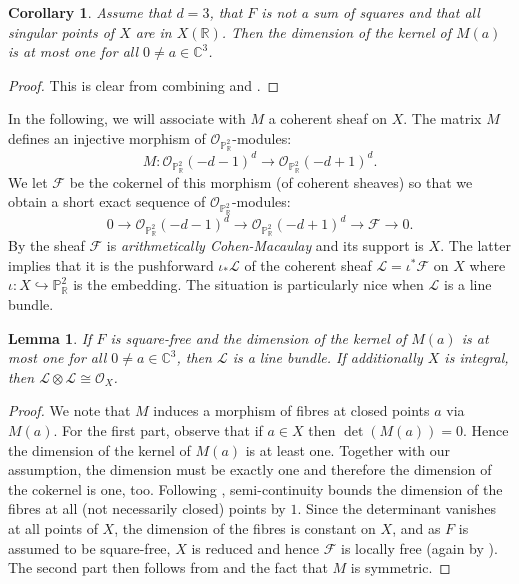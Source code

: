 \documentclass[a4paper,10pt]{amsart}
\theoremstyle{definition}
\theoremstyle{plain}
\newtheorem{lem}[Def]{Lemma}
\newtheorem{cor}[Def]{Corollary}
\newcommand{\cF}{{\mathcal F}}
\newcommand{\cL}{{\mathcal L}}
\newcommand{\cO}{{\mathcal O}}
\newcommand{\C}{{\mathbb C}}
\newcommand{\R}{{\mathbb R}}
\newcommand{\pp}{\mathbb{P}}
\begin{document}
\begin{cor}\label{cor:lb3}
 Assume that $d=3$, that $F$ is not a sum of squares and that all singular points of $X$ are in $X(\R)$. Then the dimension of the kernel of $M(a)$ is at most one for all $0\neq a\in\C^3$.
\end{cor}

\begin{proof}
 This is clear from combining  and . 
\end{proof}

In the following, we will associate with $M$ a coherent sheaf on $X$.
The matrix $M$ defines an injective morphism of $\cO_{\pp^2_\R}$-modules:
\begin{equation*}
 M\colon\cO_{\pp^2_\R}(-d-1)^d\to\cO_{\pp^2_\R}(-d+1)^d. 
\end{equation*}
We let $\cF$ be the cokernel of this morphism (of coherent sheaves) so that we obtain a short exact sequence of $\cO_{\pp^2_\R}$-modules:
\begin{equation}\label{eq:res}
 0\to\cO_{\pp^2_\R}(-d-1)^d\to\cO_{\pp^2_\R}(-d+1)^d\to\cF\to0.
\end{equation}
By \cite[Theorem A]{beauville} the sheaf $\cF$ is \emph{arithmetically
Cohen-Macaulay} and its support is $X$. The latter implies that it is the pushforward $\iota_*\cL$ of the coherent sheaf $\cL=\iota^*\cF$ on $X$ where $\iota\colon X\hookrightarrow\pp^2_\R$ is the embedding. The situation is particularly nice when $\cL$ is a line bundle.

\begin{lem}\label{lem:lb2t}
 If $F$ is square-free and the dimension of the kernel of $M(a)$ is at most one for all $0\neq a\in\C^3$, then $\cL$ is a line bundle. If additionally $X$ is integral, then $\cL\otimes\cL\cong\cO_X$.
\end{lem}

\begin{proof}
 We note that $M$ induces a morphism of fibres at closed points $a$ via $M(a)$. For the first part, observe that if $a \in X$ then $\det (M(a)) = 0$. Hence the dimension of the kernel of $M(a)$ is at least one. Together with our assumption, the dimension must be exactly one and therefore the dimension of the cokernel is one, too. Following \cite[Exercise II.5.8]{Hart77}, semi-continuity bounds the dimension of the fibres at all (not necessarily closed) points by $1$. Since the determinant vanishes at all points of $X$, the dimension of the fibres is constant on $X$, and as $F$ is assumed to be square-free, $X$ is reduced and hence $\cF$ is locally free (again by \cite[Exercise II.5.8]{Hart77}). 
 The second part then follows from \cite[Theorem B]{beauville} and the fact that $M$ is symmetric.
\end{proof}
\end{document}
